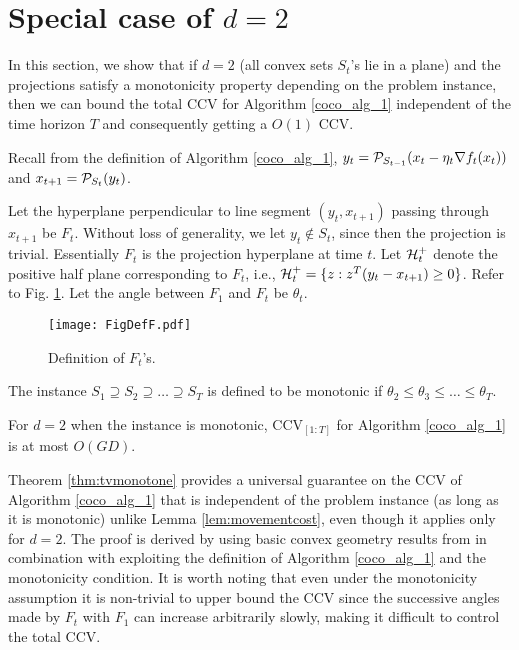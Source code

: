 \section{Special case of $d=2$}
In this section, we show that if $d=2$ (all convex sets $S_t$'s lie in a plane) and the projections satisfy a monotonicity property depending on the problem instance, then we can bound the total CCV for Algorithm \ref{coco_alg_1} independent of the time horizon $T$ and consequently getting a $O(1)$ CCV. 




Recall from the definition of Algorithm \ref{coco_alg_1}, $y_t = \mathcal{P}_{S_{t-1}}(x_t - \eta_t \nabla f_t(x_t))$ and 
$x_{t+1} = \mathcal{P}_{S_t}(y_t)$.


\begin{definition}\label{defn:projhyperplane}
Let the hyperplane perpendicular to line segment $(y_t, x_{t+1})$ passing through $x_{t+1}$ be 
$F_t$. Without loss of generality, we let $y_t \notin S_t$, since then the projection is trivial. Essentially $F_t$ is the projection hyperplane at time $t$. %
Let $\mathcal{H}_t^+$ denote the positive half plane corresponding to $F_t$, i.e., 
$\mathcal{H}_t^+ = \{z: z^T (y_t-x_{t+1})\ge 0\}$. 
Refer to Fig. \ref{fig:defF}.
Let the angle between $F_1$ and $F_t$ be $\theta_t$. 
\end{definition}
\begin{figure}


\texttt{[image: FigDefF.pdf]}


\caption{Definition of $F_t$'s.}
\label{fig:defF}
\end{figure}


\begin{definition}\label{defn:anglemonotone}
The instance $S_1 \supseteq S_2 \supseteq \dots \supseteq S_T$ is defined to be monotonic 
if $\theta_2 \le \theta_3 \le \dots \le \theta_T$.
\end{definition}




\begin{theorem}\label{thm:tvmonotone}
For $d=2$ when the instance is monotonic, $\text{CCV}_{[1:T]}$ for Algorithm \ref{coco_alg_1} is at most $O(GD)$.
\end{theorem}

Theorem \ref{thm:tvmonotone} provides a universal guarantee on the CCV of  Algorithm \ref{coco_alg_1} that is independent of the problem instance (as long as it is monotonic) unlike Lemma \ref{lem:movementcost}, even though it applies only for $d=2$. The proof is derived by using basic convex geometry results from \cite{Manselli} in combination with exploiting the definition of Algorithm \ref{coco_alg_1} and the monotonicity condition. It is worth noting that even under the monotonicity assumption it is non-trivial to upper bound the CCV since the successive angles made by $F_t$ with $F_1$ can increase arbitrarily slowly, making it difficult 
to control the total CCV. 
